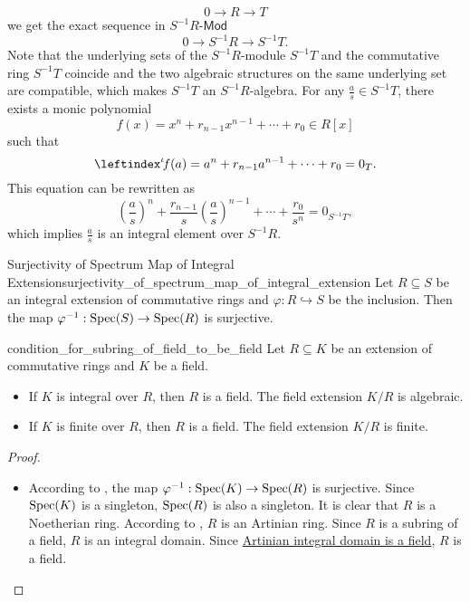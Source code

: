 \begin{prf}
\begin{enumerate}[(i)]
    \[
    0\longrightarrow R\longrightarrow T
    \]
    we get the exact sequence in $S^{-1}R\text{-}\mathsf{Mod}$
    \[
    0\longrightarrow S^{-1}R\longrightarrow S^{-1}T.
    \]
    Note that the underlying sets of the $S^{-1}R$-module $S^{-1}T$ and the commutative ring $S^{-1}T$ coincide and the two algebraic structures on the same underlying set are compatible, which makes $S^{-1}T$ an $S^{-1}R$-algebra. 
    For any $\frac{a}{s}\in S^{-1}T$, there exists a monic polynomial
    \[
    f(x)=x^n+r_{n-1}x^{n-1}+\cdots+r_0\in R[x]
    \]
    such that 
    \[
        \leftindex^{\iota}\!f(a)=a^n+r_{n-1}a^{n-1}+\cdots+r_0=0_T.
    \]
    This equation can be rewritten as
    \[
\left(\frac{a}{s}\right)^n+\frac{r_{n-1}}{s}\left(\frac{a}{s}\right)^{n-1}+\cdots+\frac{r_0}{s^n}=0_{S^{-1}T},
    \]
    which implies $\frac{a}{s}$ is an integral element over $S^{-1}R$.
    

\end{enumerate}
\end{prf}

\begin{proposition}{Surjectivity of Spectrum Map of Integral Extension}{surjectivity_of_spectrum_map_of_integral_extension}
    Let $R\subseteq S$ be an integral extension of commutative rings and $\varphi:R\hookrightarrow S$ be the inclusion. Then the map $\varphi^{-1}:\operatorname{Spec} (S)\to \operatorname{Spec} (R)$ is surjective.
\end{proposition}


\begin{proposition}{}{condition_for_subring_of_field_to_be_field}
    Let $R\subseteq K$ be an extension of commutative rings and $K$ be a field. 
    \begin{itemize}
        \item If $K$ is integral over $R$, then $R$ is a field. The field extension $K/R$ is algebraic.
        \item If $K$ is finite over $R$, then $R$ is a field. The field extension $K/R$ is finite.
    \end{itemize}
\end{proposition}
\begin{proof}
    \begin{itemize}
        \item According to , the map $\varphi^{-1}:\operatorname{Spec} (K)\to \operatorname{Spec} (R)$ is surjective. Since $\operatorname{Spec} (K)$ is a singleton, $\operatorname{Spec} (R)$ is also a singleton. It is clear that $R$ is a Noetherian ring. According to , $R$ is an Artinian ring. Since $R$ is a subring of a field, $R$ is an integral domain. Since \hyperref[th:artinian_integral_domain_is_a_field]{Artinian integral domain is a field}, $R$ is a field.
    \end{itemize}
\end{proof}

